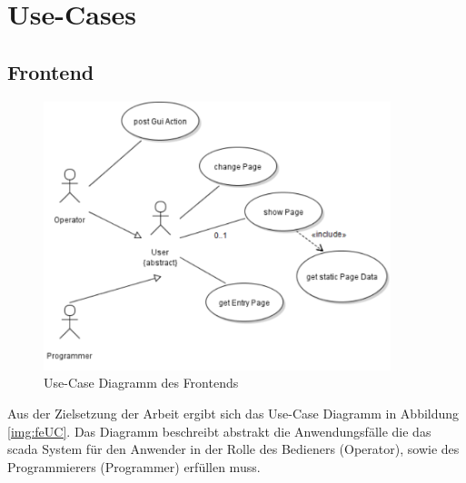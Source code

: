 \section{Use-Cases}
\subsection{Frontend}
\begin{figure}[ht]
  \centering
  \includegraphics[width=0.9\textwidth]{content/hauptteil/systemEntwurf/res/frontendUseCase.pdf}
  \caption[Use-Case Diagramm des Frontends]{Use-Case Diagramm des Frontends}
  \label{img:beUC}
\end{figure}
Aus der Zielsetzung der Arbeit ergibt sich das Use-Case Diagramm in Abbildung \ref{img:feUC}.
Das Diagramm beschreibt abstrakt die Anwendungsfälle die das \ac{scada} System für den Anwender in der Rolle des Bedieners (Operator), 
sowie des Programmierers (Programmer) erfüllen muss.

